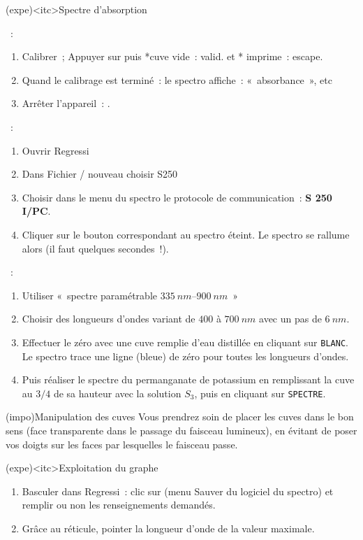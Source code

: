 \documentclass[../main/main.tex]{subfiles}
\begin{document}
{	\begin{tcb}(expe)<itc>{Spectre d'absorption}
		\begin{itemize}
			~:
			\begin{enumerate}
				\item Calibrer~; Appuyer sur  puis   *cuve vide~: valid. et *
				      imprime~: escape.
				\item Quand le calibrage est terminé~: le spectro affiche~:
				      «~absorbance~», etc
				\item Arrêter l'appareil~: .
			\end{enumerate}
			~:
			\begin{enumerate}
				\item Ouvrir Regressi
				\item Dans Fichier / nouveau choisir S250
				\item Choisir dans le menu du spectro le protocole de communication~:
				      \textbf{S 250 I/PC}.
				\item Cliquer sur le bouton correspondant au spectro éteint. Le spectro se
				      rallume alors (il faut quelques secondes~!).
			\end{enumerate}
			~:
			\begin{enumerate}
				\item Utiliser «~spectre paramétrable $\SIrange{335}{900}{nm}$~»
				\item Choisir des longueurs d'ondes variant de $400$ à $\SI{700}{nm}$ avec
				      un pas de $\SI{6}{nm}$.
				\item Effectuer le zéro avec une cuve remplie d'eau distillée en cliquant
				      sur \texttt{BLANC}. Le spectro trace une ligne (bleue) de zéro pour
				      toutes les longueurs d'ondes.
				\item Puis réaliser le spectre du permanganate de potassium en remplissant
				      la cuve au $3/4$ de sa hauteur avec la solution $S_3$, puis en
				      cliquant sur \texttt{SPECTRE}.
			\end{enumerate}
		\end{itemize}
	\end{tcb}

	\begin{tcb}[cnt](impo){Manipulation des cuves}
		Vous prendrez soin de placer les cuves dans le bon sens (face transparente
		dans le passage du faisceau lumineux), en évitant de poser vos doigts sur les
		faces par lesquelles le faisceau passe.
	\end{tcb}

	\begin{tcb}(expe)<itc>{Exploitation du graphe}
		\begin{enumerate}
			\item Basculer dans Regressi~: clic sur  (menu Sauver du logiciel
			      du spectro) et remplir ou non les renseignements demandés.
			\item Grâce au réticule, pointer la longueur d'onde de la valeur maximale.
		\end{enumerate}
	\end{tcb}
}
\end{document}
